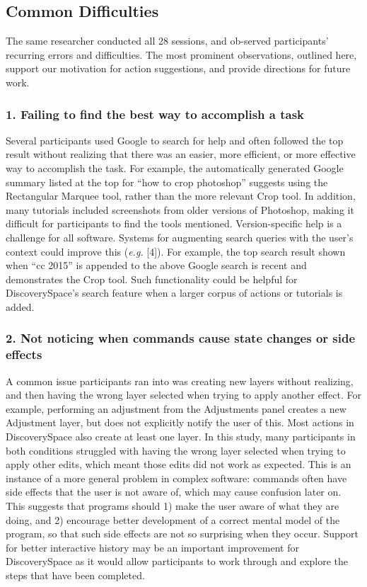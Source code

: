 \subsection{Common Difficulties}
The same researcher conducted all 28 sessions, and ob-served participants' recurring errors and difficulties. The most prominent observations, outlined here, support our motivation for action suggestions, and provide directions for future work.

\subsubsection{1. Failing to find the best way to accomplish a task}
Several participants used Google to search for help and often followed the top result without realizing that there was an easier, more efficient, or more effective way to accomplish the task. For example, the automatically generated Google summary listed at the top for ``how to crop photoshop'' suggests using the Rectangular Marquee tool, rather than the more relevant Crop tool. In addition, many tutorials included screenshots from older versions of Photoshop, making it difficult for participants to find the tools mentioned. Version-specific help is a challenge for all software. Systems for augmenting search queries with the user's context could improve this (\textit{e.g.} [4]). For example, the top search result shown when ``cc 2015'' is appended to the above Google search is recent and demonstrates the Crop tool. Such functionality could be helpful for Discovery\-Space's search feature when a larger corpus of actions or tutorials is added.

\subsubsection{2. Not noticing when commands cause state changes or side effects}
A common issue participants ran into was creating new layers without realizing, and then having the wrong layer selected when trying to apply another effect. For example, performing an adjustment from the Adjustments panel creates a new Adjustment layer, but does not explicitly notify the user of this. Most actions in Discovery\-Space also create at least one layer. In this study, many participants in both conditions struggled with having the wrong layer selected when trying to apply other edits, which meant those edits did not work as expected. This is an instance of a more general problem in complex software: commands often have side effects that the user is not aware of, which may cause confusion later on. This suggests that programs should 1) make the user aware of what they are doing, and 2) encourage better development of a correct mental model of the program, so that such side effects are not so surprising when they occur. Support for better interactive history may be an important improvement for Discovery\-Space as it would allow participants to work through and explore the steps that have been completed.

